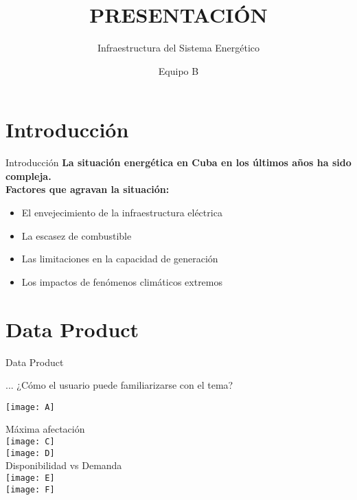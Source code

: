 \documentclass{beamer}
\title{PRESENTACIÓN}
\subtitle{Infraestructura del Sistema Energético}
\author{Equipo B}
\begin{document}
\begin{frame}
    \titlepage 
\end{frame}

\logo{}


\section{Introducción}
\begin{frame}{Introducción}
    \bfseries{La situación energética en Cuba en los últimos años ha sido compleja.}\\
    \vspace{0.5cm}
    Factores que agravan la situación:\\
    \begin{itemize}
        \item El envejecimiento de la infraestructura eléctrica
        \item La escasez de combustible
        \item Las limitaciones en la capacidad de generación
        \item Los impactos de fenómenos climáticos extremos
    \end{itemize}
\end{frame}

\section{Data Product}
\begin{frame}{Data Product}
    \begin{block}{...}
        ¿Cómo el usuario puede familiarizarse con el tema?
    \end{block}
    \vspace{1cm}
    \texttt{[image: A]}\\
\end{frame} 
\centering
    \newpage
    \vspace{1cm}
    \LARGE{Máxima afectación}\\
    \vspace{0.5cm}
    \texttt{[image: C]}\\
    \vspace{1cm}
    \texttt{[image: D]}\\
    
    \newpage
    \vspace{1cm}
    \LARGE{Disponibilidad vs Demanda}\\
    \vspace{0.5cm}
    \texttt{[image: E]}\\
    \vspace{1cm}
    \texttt{[image: F]}\\
\end{document}
